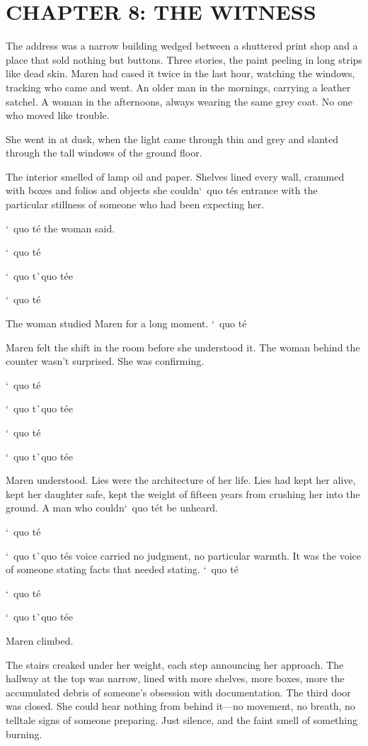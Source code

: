 \documentclass[12pt,letterpaper,openany]{book}
\begin{document}
\chapter{CHAPTER 8: THE WITNESS}
The address was a narrow building wedged between a shuttered print shop and a place that sold nothing but buttons. Three stories, the paint peeling in long strips like dead skin. Maren had cased it twice in the last hour, watching the windows, tracking who came and went. An older man in the mornings, carrying a leather satchel. A woman in the afternoons, always wearing the same grey coat. No one who moved like trouble.
\par
She went in at dusk, when the light came through thin and grey and slanted through the tall windows of the ground floor.
\par
The interior smelled of lamp oil and paper. Shelves lined every wall, crammed with boxes and folios and objects she couldn`\ quo t\'e{}s entrance with the particular stillness of someone who had been expecting her.
\par
`\ quo t\'e{} the woman said.
\par
`\ quo t\'e{}
\par
`\ quo t\`\ quo t\'e{}e{}
\par
`\ quo t\'e{}
\par
The woman studied Maren for a long moment. `\ quo t\'e{}
\par
Maren felt the shift in the room before she understood it. The woman behind the counter wasn't surprised. She was confirming.
\par
`\ quo t\'e{}
\par
`\ quo t\`\ quo t\'e{}e{}
\par
`\ quo t\'e{}
\par
`\ quo t\`\ quo t\'e{}e{}
\par
Maren understood. Lies were the architecture of her life. Lies had kept her alive, kept her daughter safe, kept the weight of fifteen years from crushing her into the ground. A man who couldn`\ quo t\'e{}t be unheard.
\par
`\ quo t\'e{}
\par
`\ quo t\`\ quo t\'e{}s voice carried no judgment, no particular warmth. It was the voice of someone stating facts that needed stating. `\ quo t\'e{}
\par
`\ quo t\'e{}
\par
`\ quo t\`\ quo t\'e{}e{}
\par
Maren climbed.
\par
The stairs creaked under her weight, each step announcing her approach. The hallway at the top was narrow, lined with more shelves, more boxes, more the accumulated debris of someone's obsession with documentation. The third door was closed. She could hear nothing from behind it—no movement, no breath, no telltale signs of someone preparing. Just silence, and the faint smell of something burning.
\end{document}
